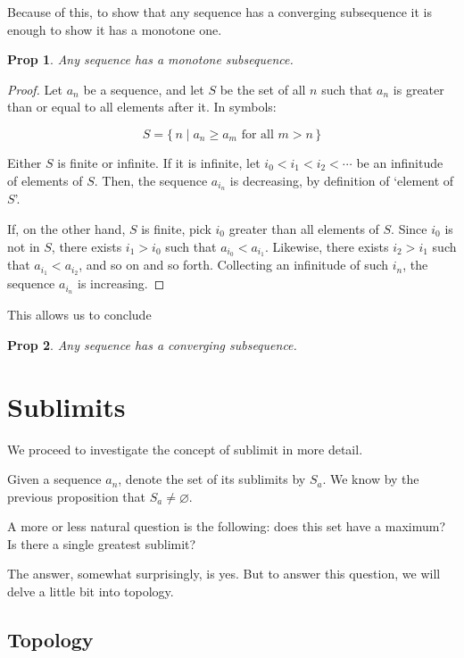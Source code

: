 \documentclass{article}
\newtheorem{prop}{Prop}
\theoremstyle{definition}
\begin{document}
	Because of this, to show that any sequence has a converging subsequence it is enough to show it has a monotone one.
	
	\begin{prop}
	Any sequence has a monotone subsequence.
	\end{prop}
	
	\begin{proof}
	Let $a_n$ be a sequence, and let $S$ be the set of all $n$ such that $a_n$ is greater than or equal to all elements after it. In symbols:
	
	\[S = \{\,n \mid a_n \geq a_m \text{ for all $m > n$}\,\}\]
	
	Either $S$ is finite or infinite. If it is infinite, let $i_0 < i_1 < i_2 < \cdots$ be an infinitude of elements of $S$. Then, the sequence $a_{i_n}$ is decreasing, by definition of `element of $S$'.
	
	If, on the other hand, $S$ is finite, pick $i_0$ greater than all elements of $S$. Since $i_0$ is not in $S$, there exists $i_1 > i_0$ such that $a_{i_0} < a_{i_1}$. Likewise, there exists $i_2 > i_1$ such that $a_{i_1} < a_{i_2}$, and so on and so forth. Collecting an infinitude of such $i_n$, the sequence $a_{i_n}$ is increasing.
	\end{proof}
	
	This allows us to conclude
	
	\begin{prop}
	Any sequence has a converging subsequence.
	\end{prop}

	\section{Sublimits}
	
	We proceed to investigate the concept of sublimit in more detail.
	
	Given a sequence $a_n$, denote the set of its sublimits by $S_a$. We know by the previous proposition that $S_a \neq \varnothing$.
	
	A more or less natural question is the following: does this set have a maximum? Is there a single greatest sublimit?
	
	The answer, somewhat surprisingly, is yes. But to answer this question, we will delve a little bit into topology.
	
	\subsection{Topology}
	
\end{document}

